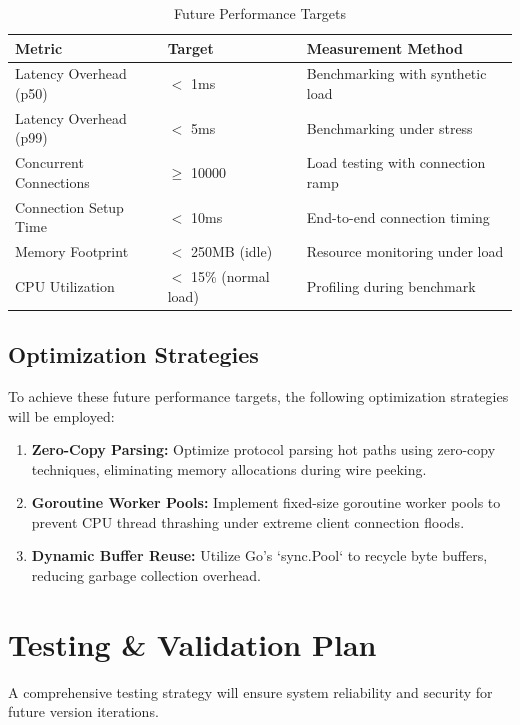 \begin{table}[H]
\centering
\caption{Future Performance Targets}
\label{tab:performance-goals}
\begin{tabular}{|l|l|l|}
\hline
\textbf{Metric} & \textbf{Target} & \textbf{Measurement Method} \\
\hline
Latency Overhead (p50) & $<$ 1ms & Benchmarking with synthetic load \\
Latency Overhead (p99) & $<$ 5ms & Benchmarking under stress \\
Concurrent Connections & $\geq$ 10000 & Load testing with connection ramp \\
Connection Setup Time & $<$ 10ms & End-to-end connection timing \\
Memory Footprint & $<$ 250MB (idle) & Resource monitoring under load \\
CPU Utilization & $<$ 15\% (normal load) & Profiling during benchmark \\
\hline
\end{tabular}
\end{table}

\subsection{Optimization Strategies}

To achieve these future performance targets, the following optimization strategies will be employed:
\begin{enumerate}
    \item \textbf{Zero-Copy Parsing:} Optimize protocol parsing hot paths using zero-copy techniques, eliminating memory allocations during wire peeking.
    \item \textbf{Goroutine Worker Pools:} Implement fixed-size goroutine worker pools to prevent CPU thread thrashing under extreme client connection floods.
    \item \textbf{Dynamic Buffer Reuse:} Utilize Go's `sync.Pool` to recycle byte buffers, reducing garbage collection overhead.
\end{enumerate}


\section{Testing \& Validation Plan}

A comprehensive testing strategy will ensure system reliability and security for future version iterations.

